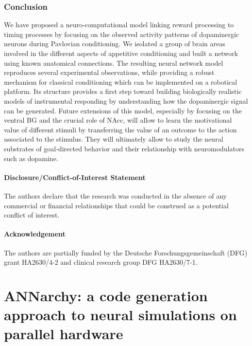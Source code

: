 \documentclass[
  11pt,
  a4paper,
]{scrbook}
\begin{document}
\subsection{Conclusion}\label{conclusion-2}

We have proposed a neuro-computational model linking reward processing
to timing processes by focusing on the observed activity patterns of
dopaminergic neurons during Pavlovian conditioning. We isolated a group
of brain areas involved in the different aspects of appetitive
conditioning and built a network using known anatomical connections. The
resulting neural network model reproduces several experimental
observations, while providing a robust mechanism for classical
conditioning which can be implemented on a robotical platform. Its
structure provides a first step toward building biologically realistic
models of instrumental responding by understanding how the dopaminergic
signal can be generated. Future extensions of this model, especially by
focusing on the ventral BG and the crucial role of NAcc, will allow to
learn the motivational value of different stimuli by transferring the
value of an outcome to the action associated to the stimulus. They will
ultimately allow to study the neural substrates of goal-directed
behavior and their relationship with neuromodulators such as dopamine.

\subsubsection*{Disclosure/Conflict-of-Interest
Statement}\label{disclosureconflict-of-interest-statement}

The authors declare that the research was conducted in the absence of
any commercial or financial relationships that could be construed as a
potential conflict of interest.

\subsubsection*{Acknowledgement}\label{acknowledgement}

The authors are partially funded by the Deutsche Forschungsgemeinschaft
(DFG) grant HA2630/4-2 and clinical research group DFG HA2630/7-1.


\chapter{ANNarchy: a code generation approach to neural simulations on
parallel hardware}\label{sec-chapter:ANNarchy}
\end{document}
